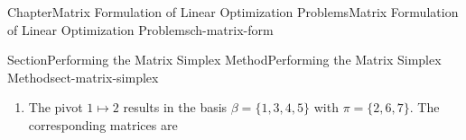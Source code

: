 \documentclass[oneside,10pt,]{book}
\numberwithin{equation}{section}
\newcommand{\amp}{&}
\begin{document}
\begin{chapterptx}{Chapter}{Matrix Formulation of Linear Optimization Problems}{}{Matrix Formulation of Linear Optimization Problems}{}{}{ch-matrix-form}
\begin{sectionptx}{Section}{Performing the Matrix Simplex Method}{}{Performing the Matrix Simplex Method}{}{}{sect-matrix-simplex}
\begin{introduction}{}
\begin{enumerate}
%
\begin{equation*}
B' \boldsymbol{b} = \begin{bmatrix} 2240 \\ 1300 \\ 4820 \\ 48340 \end{bmatrix}
\end{equation*}
%
\par
and%
\par
%
\begin{equation*}
B'\Pi = \begin{bmatrix} 320 \amp  -4 \amp  18 \\ -140 \amp  16 \amp -15 \\ -3904 \amp 140 \amp -60 \\ 3388 \amp 160 \amp 135 \\ \end{bmatrix}
\end{equation*}
%
\par
and the \(\boldsymbol{b}\)-ratios are found by dividing elements in \(B' \boldsymbol{b}\) by the elements in the first column of \(B'\Pi\) to get%
\par
%
\begin{equation*}
\begin{bmatrix} 2240/320 \\ 1300/(-140) \\ 4820/(-3904) \\ 48340/3388 \end{bmatrix} \approx \begin{bmatrix} 7 \\ -9.29 \\ -1.23 \\ 14.27 \end{bmatrix}
\end{equation*}
%
\par
and the smallest nonnegative ratio is in the first row. This corresponds to the first basis element or \(x_2\), so we perform the pivot \(1 \mapsto 2\)%
\item{}The pivot \(1 \mapsto 2\) results in the basis \(\beta = \{1,3,4,5\}\) with \(\pi=\{2,6,7\}\). The corresponding matrices are%
\par
%
\begin{equation*}

\end{equation*}
\end{enumerate}
\end{introduction}
\end{sectionptx}
\end{chapterptx}
\end{document}
